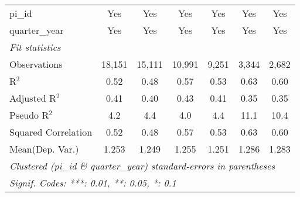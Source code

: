 \begin{tabular}{lcccccc}
   pi\_id                                                     & Yes           & Yes            & Yes           & Yes           & Yes           & Yes\\  
   quarter\_year                                              & Yes           & Yes            & Yes           & Yes           & Yes           & Yes\\  
   \midrule
   \emph{Fit statistics}\\
   Observations                                               & 18,151        & 15,111         & 10,991        & 9,251         & 3,344         & 2,682\\  
   R$^2$                                                      & 0.52          & 0.48           & 0.57          & 0.53          & 0.63          & 0.60\\  
   Adjusted R$^2$                                             & 0.41          & 0.40           & 0.43          & 0.41          & 0.35          & 0.35\\  
   Pseudo R$^2$                                               & 4.2           & 4.4            & 4.0           & 4.4           & 11.1          & 10.4\\  
   Squared Correlation                                        & 0.52          & 0.48           & 0.57          & 0.53          & 0.63          & 0.60\\  
Mean(Dep. Var.) & 1.253 & 1.249 & 1.255 & 1.251 & 1.286 & 1.283 \\
   \midrule \midrule
   \multicolumn{7}{l}{\emph{Clustered (pi\_id \& quarter\_year) standard-errors in parentheses}}\\
   \multicolumn{7}{l}{\emph{Signif. Codes: ***: 0.01, **: 0.05, *: 0.1}}\\
\end{tabular}
\par\endgroup
